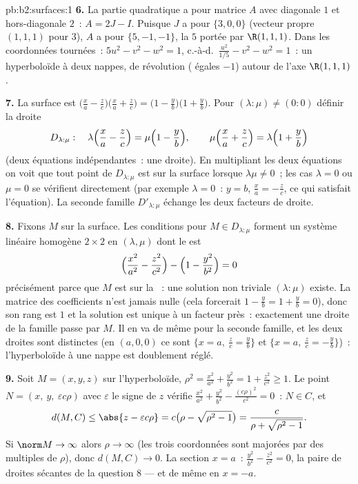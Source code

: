 \begin{solution}{pb:b2:surfaces:1}
\textbf{6.} La partie quadratique a pour matrice $A$ avec diagonale
$1$ et hors-diagonale $2$~: $A = 2J - I$. Puisque $J$ a pour 
$\{3, 0, 0\}$ (vecteur propre $(1,1,1)$ pour $3$), $A$ a pour
 $\{5, -1, -1\}$, la  $5$ portée par
$\R(1,1,1)$. Dans les coordonnées tournées~: $5u^2 - v^2 - w^2 =
1$, c.-à-d.\ $\frac{u^2}{1/5} - v^2 - w^2 = 1$~: un hyperboloïde à
deux nappes, de révolution ( égales $-1$) autour de
l'axe $\R(1,1,1)$.

\textbf{7.} La surface est $\bigl(\frac xa - \frac
zc\bigr)\bigl(\frac xa + \frac zc\bigr) = \bigl(1 - \frac
yb\bigr)\bigl(1 + \frac yb\bigr)$. Pour $(\lambda : \mu) \neq
(0:0)$ définir la droite
\[
D_{\lambda:\mu} :\quad
\lambda\Bigl(\frac xa - \frac zc\Bigr) = \mu\Bigl(1 - \frac
yb\Bigr), \qquad
\mu\Bigl(\frac xa + \frac zc\Bigr) = \lambda\Bigl(1 + \frac
yb\Bigr)
\]
(deux équations  indépendantes~: une droite). En multipliant les
deux équations on voit que tout point de $D_{\lambda:\mu}$ est
sur la surface lorsque $\lambda\mu \neq 0$~; les cas $\lambda = 0$
ou $\mu = 0$ se vérifient directement (par exemple $\lambda = 0$~: $y =
b$, $\frac xa = -\frac zc$, ce qui satisfait l'équation). La
seconde famille $D'_{\lambda:\mu}$ échange les deux facteurs de
droite.

\textbf{8.} Fixons $M$ sur la surface. Les conditions pour $M \in
D_{\lambda:\mu}$ forment un système linéaire homogène $2\times2$
en $(\lambda, \mu)$ dont le  est
\[
\Bigl(\frac{x^2}{a^2} - \frac{z^2}{c^2}\Bigr) - \Bigl(1 -
\frac{y^2}{b^2}\Bigr) = 0
\]
précisément parce que $M$ est sur la ~: une solution non triviale
$(\lambda : \mu)$ existe. La matrice des coefficients n'est
jamais nulle (cela forcerait $1 - \frac yb = 1 + \frac yb =
0$), donc son rang est $1$ et la solution est unique à un facteur près~:
exactement une droite de la famille passe par $M$.
Il en va de même pour la seconde famille, et les deux droites sont
distinctes (en $(a, 0, 0)$ ce sont $\{x = a,\ \frac zc = \frac
yb\}$ et $\{x = a,\ \frac zc = -\frac yb\}$)~: l'hyperboloïde à une
nappe est doublement réglé.

\textbf{9.} Soit $M = (x, y, z)$ sur l'hyperboloïde, $\rho^2 =
\frac{x^2}{a^2} + \frac{y^2}{b^2} = 1 + \frac{z^2}{c^2} \geq
1$. Le point $N = (x,\ y,\ \varepsilon c\rho)$ avec
$\varepsilon$ le signe de $z$ vérifie $\frac{x^2}{a^2} +
\frac{y^2}{b^2} - \frac{(c\rho)^2}{c^2} = 0$~: $N \in C$, et
\[
d(M, C) \leq \abs{z - \varepsilon c\rho}
= c\bigl(\rho - \sqrt{\rho^2 - 1}\bigr)
= \frac{c}{\rho + \sqrt{\rho^2 - 1}} .
\]
Si $\norm M \to \infty$ alors $\rho \to \infty$ (les trois
coordonnées sont majorées par des multiples de $\rho$), donc $d(M, C)
\to 0$. La section $x = a$~: $\frac{y^2}{b^2} -
\frac{z^2}{c^2} = 0$, la paire de droites sécantes de la question
8 --- et de même en $x = -a$.


\end{solution}
